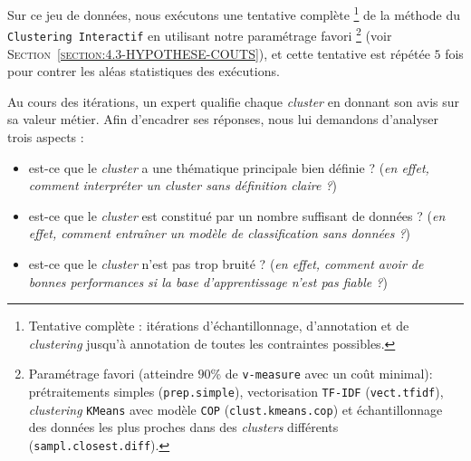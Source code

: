 			Sur ce jeu de données, nous exécutons une tentative complète \footnote{
				Tentative complète : itérations d'échantillonnage, d'annotation et de \textit{clustering} jusqu'à annotation de toutes les contraintes possibles.
			}
			de la méthode du \texttt{Clustering Interactif} en utilisant notre paramétrage favori \footnote{
				Paramétrage favori (atteindre $90$\% de \texttt{v-measure} avec un coût minimal): prétraitements simples (\texttt{prep.simple}), vectorisation \texttt{TF-IDF} (\texttt{vect.tfidf}), \textit{clustering} \texttt{KMeans} avec modèle \texttt{COP} (\texttt{clust.kmeans.cop}) et échantillonnage des données les plus proches dans des \textit{clusters} différents (\texttt{sampl.closest.diff}).
			} (voir \textsc{Section~\ref{section:4.3-HYPOTHESE-COUTS}}), et cette tentative est répétée $5$ fois pour contrer les aléas statistiques des exécutions.
			
			Au cours des itérations, un expert qualifie chaque \textit{cluster} en donnant son avis sur sa valeur métier.
			Afin d'encadrer ses réponses, nous lui demandons d'analyser trois aspects :
			\begin{itemize}
				\item est-ce que le \textit{cluster} a une thématique principale bien définie ? (\textit{en effet, comment interpréter un \textit{cluster} sans définition claire ?})
				\item est-ce que le \textit{cluster} est constitué par un nombre suffisant de données ? (\textit{en effet, comment entraîner un modèle de classification sans données ?})
				\item est-ce que le \textit{cluster} n'est pas trop bruité ? (\textit{en effet, comment avoir de bonnes performances si la base d'apprentissage n'est pas fiable ?})
			\end{itemize}
			
